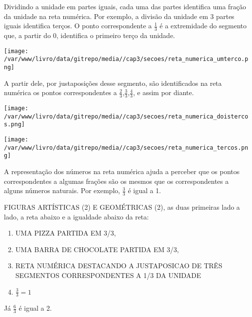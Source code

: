 \documentclass[a4,12pt]{book}
\begin{document}
Dividindo a unidade em partes iguais,  cada uma das partes identifica uma fração da unidade na reta numérica.
Por exemplo, a divisão da unidade em 3 partes iguais identifica terços. O ponto correspondente a $\frac{1}{3}$  é a extremidade do segmento que, a partir do 0, identifica o primeiro terço da unidade. 

\begin{imagem*}[breakable]{}{}       \texttt{[image: /var/www/livro/data/gitrepo/media//cap3/secoes/reta\_numerica\_umterco.png]}   \end{imagem*}

A partir dele, por justaposições desse segmento, são identificados na reta numérica os pontos correspondentes a $\frac{2}{3}$,$\frac{3}{3}$,$\frac{4}{3}$, e assim por diante. 

\begin{imagem*}[breakable]{}{}       \texttt{[image: /var/www/livro/data/gitrepo/media//cap3/secoes/reta\_numerica\_doistercos.png]}    \end{imagem*}
\begin{imagem*}[breakable]{}{}       \texttt{[image: /var/www/livro/data/gitrepo/media//cap3/secoes/reta\_numerica\_tercos.png]}   \end{imagem*}

A representação dos números na reta numérica ajuda a perceber que os pontos correspondentes a algumas frações  são os mesmos que os correspondentes a alguns números naturais. Por exemplo, $\frac{3}{3}$ é igual a 1. 

\begin{imagem*}[breakable]{}{}   FIGURAS ARTÍSTICAS (2) E GEOMÉTRICAS (2), as duas primeiras lado a lado, a reta abaixo e a igualdade abaixo da reta:  
  
\begin{enumerate} [\quad a)] %
    \item       UMA PIZZA PARTIDA EM 3/3, 
    \item       UMA BARRA DE CHOCOLATE PARTIDA EM 3/3,
    \item       RETA NUMÉRICA DESTACANDO A JUSTAPOSICAO DE TRÊS SEGMENTOS CORRESPONDENTES A 1/3 DA UNIDADE
    \item             $\frac{3}{3}=1$        
\end{enumerate} %
  
\end{imagem*}

Já $\frac{6}{3}$ é igual a 2. 
\end{document}
